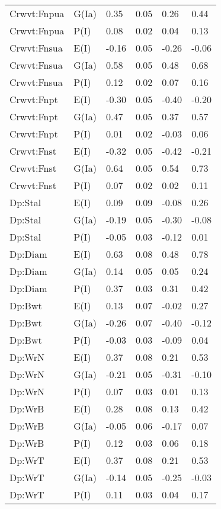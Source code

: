 \begin{center}
\begin{longtable}{|p{1.1in}|p{0.7in}|p{0.7in}|p{0.6in}|p{0.6in}|p{0.6in}|}
  Crwvt:Fnpua & G(Ia) & 0.35 & 0.05 & 0.26 & 0.44 \\ 
  Crwvt:Fnpua & P(I) & 0.08 & 0.02 & 0.04 & 0.13 \\ 
  Crwvt:Fnsua & E(I) & -0.16 & 0.05 & -0.26 & -0.06 \\ 
  Crwvt:Fnsua & G(Ia) & 0.58 & 0.05 & 0.48 & 0.68 \\ 
  Crwvt:Fnsua & P(I) & 0.12 & 0.02 & 0.07 & 0.16 \\ 
  Crwvt:Fnpt & E(I) & -0.30 & 0.05 & -0.40 & -0.20 \\ 
  Crwvt:Fnpt & G(Ia) & 0.47 & 0.05 & 0.37 & 0.57 \\ 
  Crwvt:Fnpt & P(I) & 0.01 & 0.02 & -0.03 & 0.06 \\ 
  Crwvt:Fnst & E(I) & -0.32 & 0.05 & -0.42 & -0.21 \\ 
  Crwvt:Fnst & G(Ia) & 0.64 & 0.05 & 0.54 & 0.73 \\ 
  Crwvt:Fnst & P(I) & 0.07 & 0.02 & 0.02 & 0.11 \\ 
  Dp:Stal & E(I) & 0.09 & 0.09 & -0.08 & 0.26 \\ 
  Dp:Stal & G(Ia) & -0.19 & 0.05 & -0.30 & -0.08 \\ 
  Dp:Stal & P(I) & -0.05 & 0.03 & -0.12 & 0.01 \\ 
  Dp:Diam & E(I) & 0.63 & 0.08 & 0.48 & 0.78 \\ 
  Dp:Diam & G(Ia) & 0.14 & 0.05 & 0.05 & 0.24 \\ 
  Dp:Diam & P(I) & 0.37 & 0.03 & 0.31 & 0.42 \\ 
  Dp:Bwt & E(I) & 0.13 & 0.07 & -0.02 & 0.27 \\ 
  Dp:Bwt & G(Ia) & -0.26 & 0.07 & -0.40 & -0.12 \\ 
  Dp:Bwt & P(I) & -0.03 & 0.03 & -0.09 & 0.04 \\ 
  Dp:WrN & E(I) & 0.37 & 0.08 & 0.21 & 0.53 \\ 
  Dp:WrN & G(Ia) & -0.21 & 0.05 & -0.31 & -0.10 \\ 
  Dp:WrN & P(I) & 0.07 & 0.03 & 0.01 & 0.13 \\ 
  Dp:WrB & E(I) & 0.28 & 0.08 & 0.13 & 0.42 \\ 
  Dp:WrB & G(Ia) & -0.05 & 0.06 & -0.17 & 0.07 \\ 
  Dp:WrB & P(I) & 0.12 & 0.03 & 0.06 & 0.18 \\ 
  Dp:WrT & E(I) & 0.37 & 0.08 & 0.21 & 0.53 \\ 
  Dp:WrT & G(Ia) & -0.14 & 0.05 & -0.25 & -0.03 \\ 
  Dp:WrT & P(I) & 0.11 & 0.03 & 0.04 & 0.17 \\ 

\end{longtable}
\end{center}
